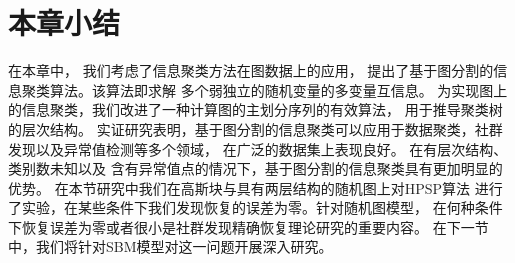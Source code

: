\section{本章小结}
在本章中，
我们考虑了信息聚类方法在图数据上的应用，
提出了基于图分割的信息聚类算法。该算法即求解
多个弱独立的随机变量的多变量互信息。
为实现图上的信息聚类，我们改进了一种计算图的主划分序列的有效算法，
用于推导聚类树的层次结构。
实证研究表明，基于图分割的信息聚类可以应用于数据聚类，社群发现以及异常值检测等多个领域，
在广泛的数据集上表现良好。
在有层次结构、类别数未知以及
含有异常值点的情况下，基于图分割的信息聚类具有更加明显的优势。
在本节研究中我们在高斯块与具有两层结构的随机图上对HPSP算法
进行了实验，在某些条件下我们发现恢复的误差为零。针对随机图模型，
在何种条件下恢复误差为零或者很小是社群发现精确恢复理论研究的重要内容。
在下一节中，我们将针对SBM模型对这一问题开展深入研究。
